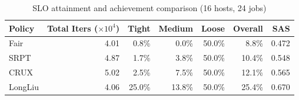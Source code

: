 \begin{table}[t]
\centering
\caption{SLO attainment and achievement comparison (16 hosts, 24 jobs)}
\label{tab:slo_16host}
\begin{tabular}{l|r|r|r|r|r|r}
\hline
Policy & Total Iters ($\times 10^4$) & Tight & Medium & Loose & Overall & SAS \\
\hline
Fair & 4.01 & 0.8\% & 0.0\% & 50.0\% & 8.8\% & 0.472 \\
SRPT & 4.87 & 1.7\% & 3.8\% & 50.0\% & 10.4\% & 0.548 \\
CRUX & 5.02 & 2.5\% & 7.5\% & 50.0\% & 12.1\% & 0.565 \\
LongLiu & 4.06 & 25.0\% & 13.8\% & 50.0\% & 25.4\% & 0.670 \\
\hline
\end{tabular}
\end{table}
